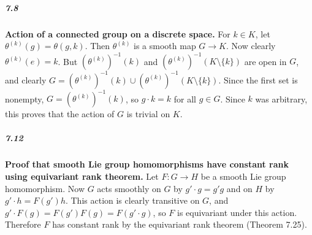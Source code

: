 \documentclass[10pt,letter]{article}
\begin{document}
\subparagraph{7.8} {\bf Action of a connected group on a discrete space.} For $k \in K$, let $\theta^{(k)}(g) = \theta(g,k)$. Then $\theta^{(k)}$ is a smooth map $G \rightarrow K$. Now clearly $\theta^{(k)}(e) = k$. But $(\theta^{(k)})^{-1}(k)$ and $(\theta^{(k)})^{-1}(K \setminus \lbrace k \rbrace)$ are open in $G$, and clearly $G = (\theta^{(k)})^{-1}(k) \cup (\theta^{(k)})^{-1}(K \setminus \lbrace k \rbrace)$. Since the first set is nonempty, $G =  (\theta^{(k)})^{-1}(k)$, so $g \cdot k = k$ for all $g \in G$. Since $k$ was arbitrary, this proves that the action of $G$ is trivial on $K$. 

\subparagraph{7.12} {\bf Proof that smooth Lie group homomorphisms have constant rank using equivariant rank theorem.} Let $F: G \rightarrow H$ be a smooth Lie group homomorphism. Now $G$ acts smoothly on $G$ by $g' \cdot g = g'g$ and on $H$ by $g' \cdot h = F(g')h$. This action is clearly transitive on $G$, and $g' \cdot F(g) = F(g') F(g) = F(g' \cdot g)$, so $F$ is equivariant under this action. Therefore $F$ has constant rank by the equivariant rank theorem (Theorem 7.25).
\end{document}
